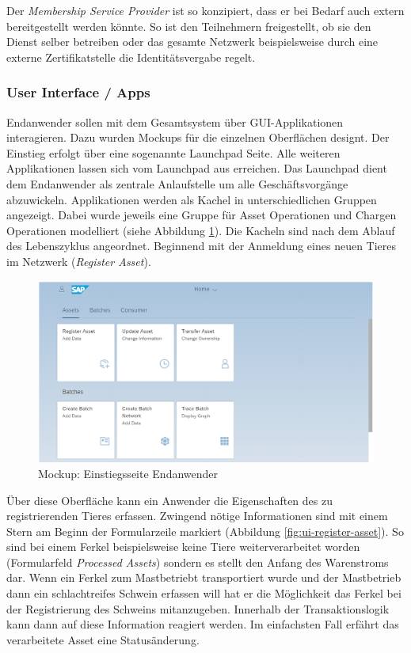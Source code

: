 Der \textit{Membership Service Provider} ist so konzipiert, dass er bei Bedarf auch extern bereitgestellt werden könnte. So ist den Teilnehmern freigestellt, ob sie den Dienst selber betreiben oder das gesamte Netzwerk beispielsweise durch eine externe Zertifikatstelle die Identitätsvergabe regelt.

\subsubsection{User Interface / \DH Apps}
Endanwender sollen mit dem Gesamtsystem über GUI-Applikationen interagieren. Dazu wurden Mockups für die einzelnen Oberflächen designt. Der Einstieg erfolgt über eine sogenannte Launchpad Seite. Alle weiteren Applikationen lassen sich vom Launchpad aus erreichen. Das Launchpad dient dem Endanwender als zentrale Anlaufstelle um alle Geschäftsvorgänge abzuwickeln. Applikationen werden als Kachel in unterschiedlichen Gruppen angezeigt. Dabei wurde jeweils eine Gruppe für Asset Operationen und Chargen Operationen modelliert (siehe Abbildung \ref{fig:ui-launchpad}). Die Kacheln sind nach dem Ablauf des Lebenszyklus angeordnet. Beginnend mit der Anmeldung eines neuen Tieres im Netzwerk (\textit{Register Asset}).

\begin{figure}[H]
	\centering
	\includegraphics[width=1\linewidth]{pictures/ui-launchpad}
	\caption[Mockup: Einstiegsseite Endanwender]{Mockup: Einstiegsseite Endanwender}
	\label{fig:ui-launchpad}
\end{figure}

Über diese Oberfläche kann ein Anwender die Eigenschaften des zu registrierenden Tieres erfassen. Zwingend nötige Informationen sind mit einem Stern am Beginn der Formularzeile markiert (Abbildung \ref{fig:ui-register-asset}). So sind bei einem Ferkel beispielsweise keine Tiere weiterverarbeitet worden (Formularfeld \textit{Processed Assets}) sondern es stellt den Anfang des Warenstroms dar. Wenn ein Ferkel zum Mastbetriebt transportiert wurde und der Mastbetrieb dann ein schlachtreifes Schwein erfassen will hat er die Möglichkeit das Ferkel bei der Registrierung des Schweins mitanzugeben. Innerhalb der Transaktionslogik kann dann auf diese Information reagiert werden. Im einfachsten Fall erfährt das verarbeitete Asset eine Statusänderung.

